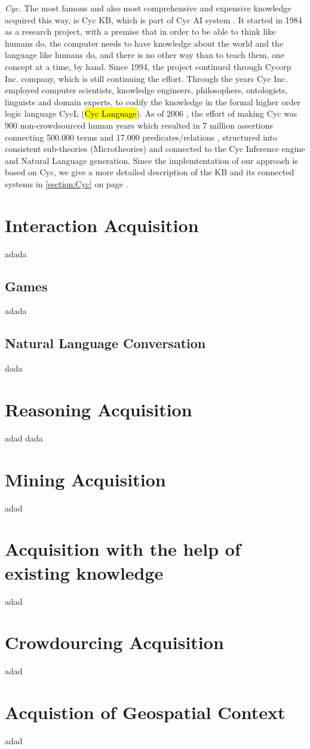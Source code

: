  \emph{Cyc.} The most famous and also most comprehensive and expensive knowledge acquired this way, is Cyc KB, which is part of Cyc AI system \parencite{Lenat1995}. It started in 1984 as a research project, with a premise that in order to be able to think like humans do, the computer needs to have knowledge about the world and the language like humans do, and there is no other way than to teach them, one concept at a time, by hand. Since 1994, the project continued through Cycorp Inc. company, which is still continuing the effort. Through the years Cyc Inc. employed computer scientists, knowledge engineers, philosophers, ontologists, linguists and domain experts, to codify the knowledge in the formal higher order logic language CycL (\hl{Cyc Language}). As of 2006   \parencite{Matuszek2006}, the effort of making Cyc was 900 non-crowdsourced human years which resulted in 7 million assertions connecting 500.000 terms and 17.000 predicates/relations \parencite{Zang2013}, structured into consistent sub-theories (Microtheories) and connected to the Cyc Inference engine and Natural Language generation. Since the implemtentation of our approach is based on Cyc, we give a more detailed description of the KB and its connected systems in \autoref{section:Cyc} on page \pageref{section:Cyc}.

\section{Interaction Acquisition}
adada
\subsection{Games}
adada
\subsection{Natural Language Conversation}
dada

\section{Reasoning Acquisition}
adad dada

\section{Mining Acquisition}
adad

\section{Acquisition with the help of existing knowledge}
adad

\section{Crowdourcing Acquisition}
adad

\section{Acquistion of Geospatial Context}
adad
